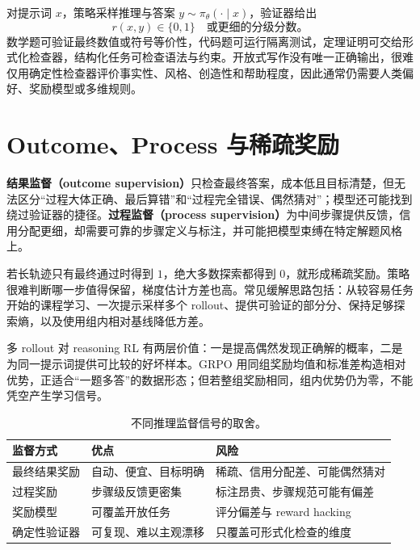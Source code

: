 \figRLVR

对提示词 $x$，策略采样推理与答案 $y\sim\pi_\theta(\cdot\mid x)$，验证器给出
\[
r(x,y)\in\{0,1\}
\quad\text{或更细的分级分数。}
\]
数学题可验证最终数值或符号等价性，代码题可运行隔离测试，定理证明可交给形式化检查器，结构化任务可检查语法与约束。开放式写作没有唯一正确输出，很难仅用确定性检查器评价事实性、风格、创造性和帮助程度，因此通常仍需要人类偏好、奖励模型或多维规则。

\section{Outcome、Process 与稀疏奖励}

\textbf{结果监督（outcome supervision）}只检查最终答案，成本低且目标清楚，但无法区分“过程大体正确、最后算错”和“过程完全错误、偶然猜对”；模型还可能找到绕过验证器的捷径。\textbf{过程监督（process supervision）}为中间步骤提供反馈，信用分配更细，却需要可靠的步骤定义与标注，并可能把模型束缚在特定解题风格上。

若长轨迹只有最终通过时得到 $1$，绝大多数探索都得到 $0$，就形成稀疏奖励。策略很难判断哪一步值得保留，梯度估计方差也高。常见缓解思路包括：从较容易任务开始的课程学习、一次提示采样多个 rollout、提供可验证的部分分、保持足够探索熵，以及使用组内相对基线降低方差。

多 rollout 对 reasoning RL 有两层价值：一是提高偶然发现正确解的概率，二是为同一提示词提供可比较的好坏样本。GRPO 用同组奖励均值和标准差构造相对优势，正适合“一题多答”的数据形态；但若整组奖励相同，组内优势仍为零，不能凭空产生学习信号。

\begin{table}[htbp]
\centering
\small
\begin{tabularx}{0.92\textwidth}{lYY}
\toprule
监督方式 & 优点 & 风险\\
\midrule
最终结果奖励 & 自动、便宜、目标明确 & 稀疏、信用分配差、可能偶然猜对\\
过程奖励 & 步骤级反馈更密集 & 标注昂贵、步骤规范可能有偏差\\
奖励模型 & 可覆盖开放任务 & 评分偏差与 reward hacking\\
确定性验证器 & 可复现、难以主观漂移 & 只覆盖可形式化检查的维度\\
\bottomrule
\end{tabularx}
\caption{不同推理监督信号的取舍。}
\end{table}

